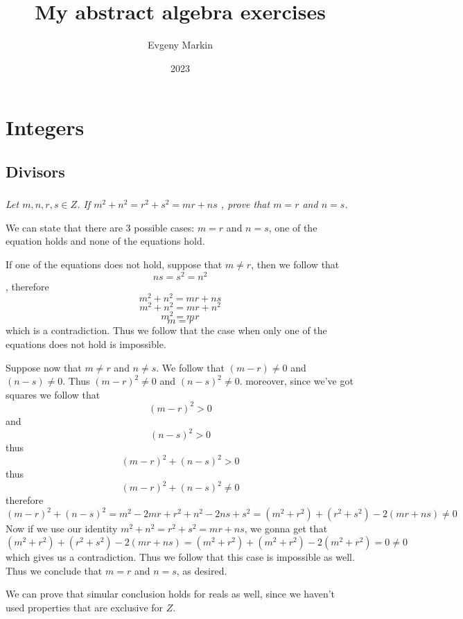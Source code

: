 \documentclass[11pt,oneside,titlepage]{book}
\title{My abstract algebra exercises}
\author{Evgeny Markin}
\date{2023}
\begin{document}
\maketitle
\tableofcontents

\chapter{Integers}

\section{Divisors}

\subsection{}

\textit{Let $m, n, r, s \in Z$. If $m^2 + n^2 = r^2 + s^2 = mr + ns$ , prove that $m = r$ and
  $n = s$.}

We can state that there are 3 possible cases: $m = r$ and $n = s$, one of the equation holds and
none of the equations hold. 

If one of the equations does not hold, suppose that $m \neq r$, then we follow that
$$ns = s^2 = n^2$$, therefore
$$m^2 + n^2 = mr + ns$$
$$m^2 + n^2 = mr + n^2$$
$$m^2 = mr$$
$$m = r$$
which is a contradiction. Thus we follow that the case when only one of the equations
does not hold is impossible.

Suppose now that $m \neq r$ and $n \neq s$. We follow that $(m - r) \neq 0$ and
$(n - s) \neq 0$. Thus $(m - r)^2 \neq 0$ and $(n - s)^2 \neq 0$. moreover, since
we've got squares we follow that
$$(m - r)^2 > 0$$
and
$$(n - s)^2 > 0$$
thus
$$(m - r)^2 + (n - s)^2 > 0$$
thus
$$(m - r)^2 + (n - s)^2 \neq 0$$
therefore 
$$(m - r)^2 + (n - s)^2 = m^2 - 2mr + r^2 + n^2 - 2ns + s^2 =
(m^2 + r^2) + (r^2 + s^2) - 2(mr + ns) \neq 0$$
Now if we use our identity  $m^2 + n^2 = r^2 + s^2 = mr + ns$, we gonna get that
$$(m^2 + r^2) + (r^2 + s^2) - 2(mr + ns) = (m^2 + r^2) + (m^2 + r^2) - 2(m^2 + r^2) = 0 \neq 0$$
which gives us a contradiction. Thus we follow that this case is impossible as well.
Thus we conclude that $m = r$ and $n = s$, as desired.

We can prove that simular conclusion holds for reals as well, since we haven't used properties
that are exclusive for $Z$.

\subsection{}
\end{document}
